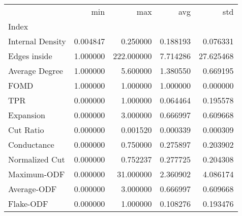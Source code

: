 \begin{tabular}{lrrrr}
\toprule
{} &       min &         max &       avg &        std \\
Index            &           &             &           &            \\
\midrule
Internal Density &  0.004847 &    0.250000 &  0.188193 &   0.076331 \\
Edges inside     &  1.000000 &  222.000000 &  7.714286 &  27.625468 \\
Average Degree   &  1.000000 &    5.600000 &  1.380550 &   0.669195 \\
FOMD             &  1.000000 &    1.000000 &  1.000000 &   0.000000 \\
TPR              &  0.000000 &    1.000000 &  0.064464 &   0.195578 \\
Expansion        &  0.000000 &    3.000000 &  0.666997 &   0.609668 \\
Cut Ratio        &  0.000000 &    0.001520 &  0.000339 &   0.000309 \\
Conductance      &  0.000000 &    0.750000 &  0.275897 &   0.203902 \\
Normalized Cut   &  0.000000 &    0.752237 &  0.277725 &   0.204308 \\
Maximum-ODF      &  0.000000 &   31.000000 &  2.360902 &   4.086174 \\
Average-ODF      &  0.000000 &    3.000000 &  0.666997 &   0.609668 \\
Flake-ODF        &  0.000000 &    1.000000 &  0.108276 &   0.193476 \\
\bottomrule
\end{tabular}

